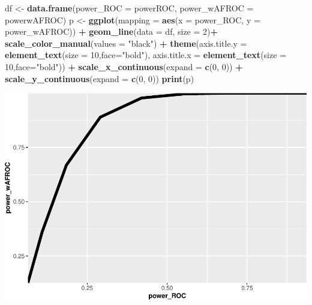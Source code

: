 \documentclass[
]{book}
\newenvironment{Shaded}{\begin{snugshade}}{\end{snugshade}}
\newcommand{\DataTypeTok}[1]{\textcolor[rgb]{0.13,0.29,0.53}{#1}}
\newcommand{\DecValTok}[1]{\textcolor[rgb]{0.00,0.00,0.81}{#1}}
\newcommand{\KeywordTok}[1]{\textcolor[rgb]{0.13,0.29,0.53}{\textbf{#1}}}
\newcommand{\NormalTok}[1]{#1}
\newcommand{\OperatorTok}[1]{\textcolor[rgb]{0.81,0.36,0.00}{\textbf{#1}}}
\newcommand{\StringTok}[1]{\textcolor[rgb]{0.31,0.60,0.02}{#1}}
\begin{document}
\begin{Shaded}
\begin{Highlighting}[]
\NormalTok{df \textless{}{-}}\StringTok{ }\KeywordTok{data.frame}\NormalTok{(}\DataTypeTok{power\_ROC =}\NormalTok{ powerROC, }\DataTypeTok{power\_wAFROC =}\NormalTok{ powerwAFROC)}
\NormalTok{p \textless{}{-}}\StringTok{ }\KeywordTok{ggplot}\NormalTok{(}\DataTypeTok{mapping =} \KeywordTok{aes}\NormalTok{(}\DataTypeTok{x =}\NormalTok{ power\_ROC, }\DataTypeTok{y =}\NormalTok{ power\_wAFROC)) }\OperatorTok{+}
\StringTok{  }\KeywordTok{geom\_line}\NormalTok{(}\DataTypeTok{data =}\NormalTok{ df, }\DataTypeTok{size =} \DecValTok{2}\NormalTok{)}\OperatorTok{+}
\StringTok{  }\KeywordTok{scale\_color\_manual}\NormalTok{(}\DataTypeTok{values =} \StringTok{"black"}\NormalTok{) }\OperatorTok{+}\StringTok{ }
\StringTok{  }\KeywordTok{theme}\NormalTok{(}\DataTypeTok{axis.title.y =} \KeywordTok{element\_text}\NormalTok{(}\DataTypeTok{size =} \DecValTok{10}\NormalTok{,}\DataTypeTok{face=}\StringTok{"bold"}\NormalTok{),}
        \DataTypeTok{axis.title.x =} \KeywordTok{element\_text}\NormalTok{(}\DataTypeTok{size =} \DecValTok{10}\NormalTok{,}\DataTypeTok{face=}\StringTok{"bold"}\NormalTok{))  }\OperatorTok{+}
\StringTok{  }\KeywordTok{scale\_x\_continuous}\NormalTok{(}\DataTypeTok{expand =} \KeywordTok{c}\NormalTok{(}\DecValTok{0}\NormalTok{, }\DecValTok{0}\NormalTok{)) }\OperatorTok{+}\StringTok{ }
\StringTok{  }\KeywordTok{scale\_y\_continuous}\NormalTok{(}\DataTypeTok{expand =} \KeywordTok{c}\NormalTok{(}\DecValTok{0}\NormalTok{, }\DecValTok{0}\NormalTok{))}
\KeywordTok{print}\NormalTok{(p)}
\end{Highlighting}
\end{Shaded}

\begin{center}\includegraphics{17-FrocSampleSize1_files/figure-latex/unnamed-chunk-14-1} \end{center}
\end{document}
